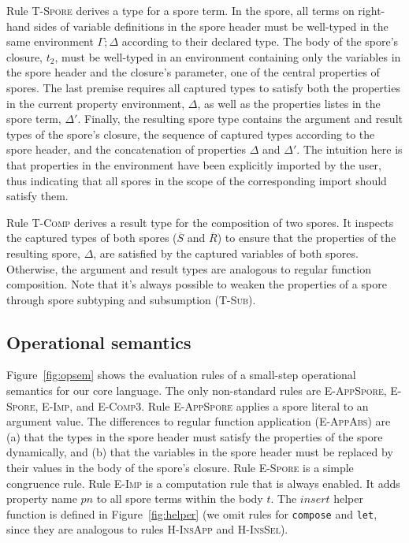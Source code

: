 \documentclass{llncs}
\newcommand{\seq}[1]{\overline{#1}}
\begin{document}
Rule \textsc{T-Spore} derives a type for a spore term. In the spore, all terms on right-hand sides of variable definitions in the spore header must be well-typed in the same environment $\Gamma ; \Delta$ according to their declared type. The body of the spore's closure, $t_2$, must be well-typed in an environment containing only the variables in the spore header and the closure's parameter, one of the central properties of spores. The last premise requires all captured types to satisfy both the properties in the current property environment, $\Delta$, as well as the properties listes in the spore term, $\Delta'$. Finally, the resulting spore type contains the argument and result types of the spore's closure, the sequence of captured types according to the spore header, and the concatenation of properties $\Delta$ and $\Delta'$. The intuition here is that properties in the environment have been explicitly imported by the user, thus indicating that all spores in the scope of the corresponding import should satisfy them.

Rule \textsc{T-Comp} derives a result type for the composition of two spores. It inspects the captured types of both spores ($\seq{S}$ and $\seq{R}$) to ensure that the properties of the resulting spore, $\Delta$, are satisfied by the captured variables of both spores. Otherwise, the argument and result types are analogous to regular function composition. Note that it's always possible to weaken the properties of a spore through spore subtyping and subsumption (\textsc{T-Sub}).

\subsection{Operational semantics}\label{sec:opsem}

Figure~\ref{fig:opsem} shows the evaluation rules of a small-step operational semantics for our core language. The only non-standard rules are \textsc{E-AppSpore}, \textsc{E-Spore}, \textsc{E-Imp}, and \textsc{E-Comp3}. Rule \textsc{E-AppSpore} applies a spore literal to an argument value. The differences to regular function application (\textsc{E-AppAbs}) are (a) that the types in the spore header must satisfy the properties of the spore dynamically, and (b) that the variables in the spore header must be replaced by their values in the body of the spore's closure. Rule \textsc{E-Spore} is a simple congruence rule. Rule \textsc{E-Imp} is a computation rule that is always enabled. It adds property name $pn$ to all spore terms within the body $t$. The $insert$ helper function is defined in Figure~\ref{fig:helper} (we omit rules for \verb|compose| and \verb|let|, since they are analogous to rules \textsc{H-InsApp} and \textsc{H-InsSel}).
\end{document}
